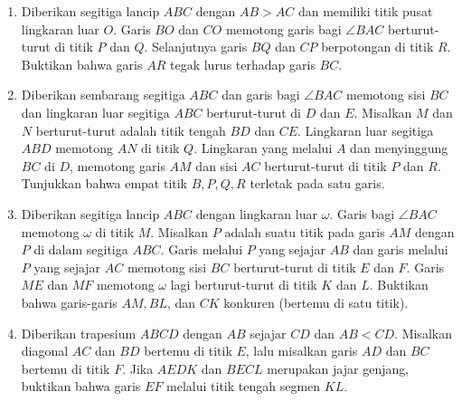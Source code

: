 \documentclass{article}[12pt]
\begin{document}
\begin{enumerate}
		\item
		Diberikan segitiga lancip $ABC$ dengan $AB > AC$ dan memiliki titik pusat lingkaran luar $O$. Garis $BO$ dan $CO$ memotong garis bagi $\angle BAC$ berturut-turut di titik $P$ dan $Q$. Selanjutnya garis $BQ$ dan $CP$ berpotongan di titik $R$. Buktikan bahwa garis $AR$ tegak lurus terhadap garis $BC$.
		
		\item
		Diberikan sembarang segitiga $ABC$ dan garis bagi $\angle BAC$ memotong sisi $BC$ dan lingkaran luar segitiga $ABC$ berturut-turut di $D$ dan $E$. Misalkan $M$ dan $N$ berturut-turut adalah titik tengah $BD$ dan $CE$. Lingkaran luar segitiga $ABD$ memotong $AN$ di titik $Q$. Lingkaran yang melalui $A$ dan menyinggung $BC$ di $D$, memotong garis $AM$ dan sisi $AC$ berturut-turut di titik $P$ dan $R$. Tunjukkan bahwa empat titik $B,P,Q,R$ terletak pada satu garis.
		
		\item
		Diberikan segitiga lancip $ABC$ dengan lingkaran luar $\omega$. Garis bagi $\angle BAC$ memotong $\omega$ di titik $M$. Misalkan $P$ adalah suatu titik pada garis $AM$ dengan $P$ di dalam segitiga $ABC$. Garis melalui $P$ yang sejajar $AB$ dan garis melalui $P$ yang sejajar $AC$ memotong sisi $BC$ berturut-turut di titik $E$ dan $F$. Garis $ME$ dan $MF$ memotong $\omega$ lagi berturut-turut di titik $K$ dan $L$. Buktikan bahwa garis-garis $AM,BL$, dan $CK$ konkuren (bertemu di satu titik).
		
		\item
		Diberikan trapesium $ABCD$ dengan $AB$ sejajar $CD$ dan $AB<CD$. Misalkan diagonal $AC$ dan $BD$ bertemu di titik $E$, lalu misalkan garis $AD$ dan $BC$ bertemu di titik $F$. Jika $AEDK$ dan $BECL$ merupakan jajar genjang, buktikan bahwa garis $EF$ melalui titik tengah segmen $KL$.
		
		
	\end{enumerate}
	
	
\end{document}
